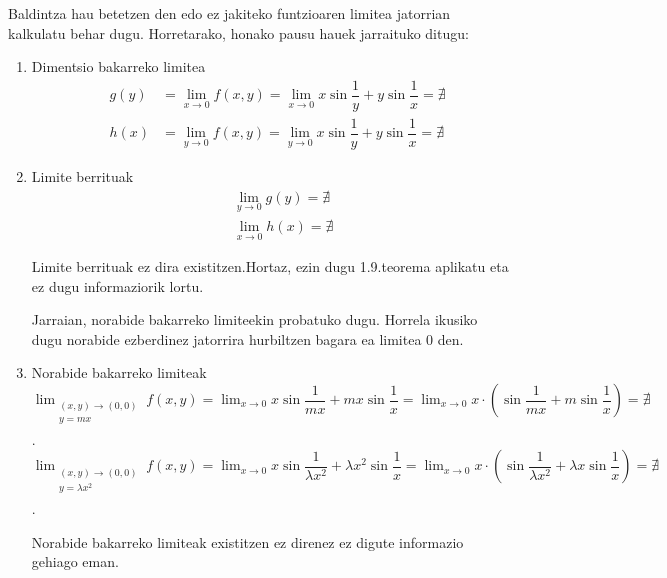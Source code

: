 Baldintza hau betetzen den edo ez jakiteko funtzioaren limitea jatorrian kalkulatu behar dugu. Horretarako, honako pausu hauek jarraituko ditugu:
\begin{enumerate}
    \item Dimentsio bakarreko limitea
    \begin{eqnarray*}
        &g(y)&=\lim_{x \to 0}f(x,y)=\lim_{x \to 0} x\sin \dfrac{1}{y} +y \sin \dfrac{1}{x}= \nexists\\
        &h(x)&=\lim_{y \to 0}f(x,y)=\lim_{y \to 0} x\sin \dfrac{1}{y} +y \sin \dfrac{1}{x}= \nexists
    \end{eqnarray*}
    
    \item Limite berrituak
    \begin{eqnarray*}
        &&\lim_{y \to 0}g(y)=\nexists\\
        &&\lim_{x \to 0}h(x)=\nexists
    \end{eqnarray*}
    
    Limite berrituak ez dira existitzen.Hortaz, ezin dugu 1.9.teorema aplikatu eta ez dugu informaziorik lortu. 
    
    Jarraian, norabide bakarreko limiteekin probatuko dugu. Horrela ikusiko dugu norabide ezberdinez jatorrira hurbiltzen bagara ea limitea 0 den.
    \item Norabide bakarreko limiteak \newline
    \newline
    $\displaystyle{ \lim_{ \begin{array}{c} \scriptstyle (x,y) \rightarrow (0,0) \\ \scriptstyle y=mx \\ \end{array} } f(x,y)= \lim_{x \rightarrow 0} x\sin \dfrac{1}{mx} +mx \sin \dfrac{1}{x}=\lim_{x \rightarrow 0} x\cdot\left(\sin \dfrac{1}{mx} +m \sin \dfrac{1}{x}\right)=\nexists } $.
    \newline
    $\displaystyle{ \lim_{ \begin{array}{c} \scriptstyle (x,y) \rightarrow (0,0) \\ \scriptstyle y=\lambda x^2 \\ \end{array} }f(x,y)= \lim_{x \rightarrow 0} x\sin \dfrac{1}{\lambda x^2} +\lambda x^2 \sin \dfrac{1}{x}=\lim_{x \rightarrow 0} x\cdot\left(\sin \dfrac{1}{\lambda x^2} +\lambda x \sin \dfrac{1}{x}\right)=\nexists } $.
    
    Norabide bakarreko limiteak existitzen ez direnez ez digute informazio gehiago eman.
    

\end{enumerate}

